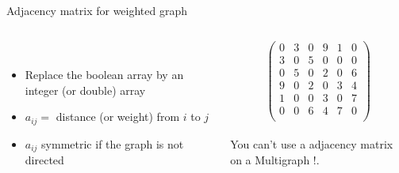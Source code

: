 \documentclass[handout,code={Graphs I},title={Introduction, DFS, BFS}]{../share/cpslide}
\begin{document}
\begin{frame}{Adjacency matrix for weighted graph}
\begin{columns}[T] %
\begin{column}[b]{0.6\linewidth}
\begin{minipage}{\linewidth}

\begin{figure}
\begin{adjustbox}{max totalsize={.4\textwidth}{.4\textheight}}
\\
\end{adjustbox}
\end{figure}

\begin{itemize}
\item Replace the boolean array by an integer (or double) array
\item $a_{ij}= $ distance (or weight) from $i$ to $j$
\item $a_{ij}$ symmetric if the graph is not directed
\end{itemize}
\end{minipage}
\end{column}
\begin{column}[b]{0.4\linewidth}
\begin{minipage}{\linewidth}


$$
\begin{pmatrix}
0 & 3 & 0 & 9 & 1 & 0\\ 
3 & 0 & 5 & 0 & 0 & 0\\
0 & 5 & 0 & 2 & 0 & 6\\
9 & 0 & 2 & 0 & 3 & 4\\
1 & 0 & 0 & 3 & 0 & 7\\
0 & 0 & 6 & 4 & 7 & 0\\

\end{pmatrix}
$$\\

You can't use a adjacency matrix on a Multigraph !.


\end{minipage}
\end{column}
\end{columns}

\end{frame}
\end{document}
